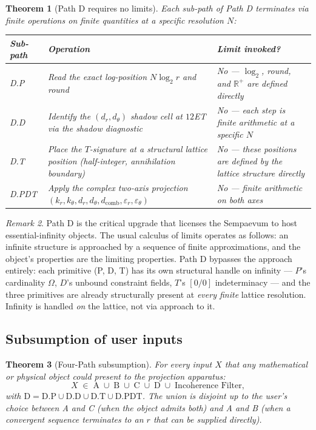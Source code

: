 \documentclass[11pt,a4paper]{article}
\newtheorem{theorem}{Theorem}[section]
\theoremstyle{definition}
\theoremstyle{remark}
\newtheorem{remark}[theorem]{Remark}
\newcommand{\R}{\mathbb{R}}
\begin{document}
\begin{theorem}[Path D requires no limits]\label{thm:d-no-limits}
Each sub-path of Path D terminates via finite operations on finite quantities at a specific resolution $N$:
\begin{center}
\begin{tabular}{@{}l l l@{}}
\toprule
Sub-path & Operation & Limit invoked?\\
\midrule
D.P & Read the exact log-position $N\log_{2}r$ and round & No --- $\log_{2}$, round, and $\R^{+}$ are defined directly\\
D.D & Identify the $(d_{r},d_{\theta})$ shadow cell at $12$ET via the shadow diagnostic & No --- each step is finite arithmetic at a specific $N$\\
D.T & Place the $T$-signature at a structural lattice position (half-integer, annihilation boundary) & No --- these positions are defined by the lattice structure directly\\
D.PDT & Apply the complex two-axis projection $(k_{r},k_{\theta},d_{r},d_{\theta},d_{\mathrm{comb}},\varepsilon_{r},\varepsilon_{\theta})$ & No --- finite arithmetic on both axes\\
\bottomrule
\end{tabular}
\end{center}
\end{theorem}

\begin{remark}
Path D is the critical upgrade that licenses the Sempaevum to host essential-infinity objects. The usual calculus of limits operates as follows: an infinite structure is approached by a sequence of finite approximations, and the object's properties are the limiting properties. Path D bypasses the approach entirely: each primitive (P, D, T) has its own structural handle on infinity --- $P$'s cardinality $\Omega$, $D$'s unbound constraint fields, $T$'s $[0/0]$ indeterminacy --- and the three primitives are already structurally present at \emph{every finite} lattice resolution. Infinity is handled \emph{on} the lattice, not via approach to it.
\end{remark}

\subsection{Subsumption of user inputs}

\begin{theorem}[Four-Path subsumption]\label{thm:four-path-subsumption}
For every input $X$ that any mathematical or physical object could present to the projection apparatus:
\[
X \;\in\; \mathrm{A} \;\cup\; \mathrm{B} \;\cup\; \mathrm{C} \;\cup\; \mathrm{D} \;\cup\; \text{Incoherence Filter},
\]
with $\mathrm{D} = \mathrm{D.P}\cup\mathrm{D.D}\cup\mathrm{D.T}\cup\mathrm{D.PDT}$. The union is disjoint up to the user's choice between A and C (when the object admits both) and A and B (when a convergent sequence terminates to an $r$ that can be supplied directly).
\end{theorem}
\end{document}
